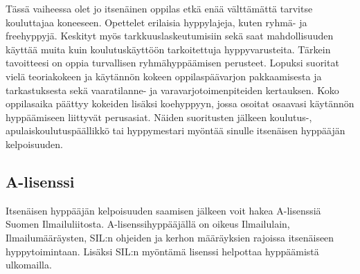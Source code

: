 Tässä vaiheessa olet jo itsenäinen oppilas etkä enää välttämättä tarvitse kouluttajaa koneeseen. Opettelet erilaisia hyppylajeja, kuten ryhmä- ja freehyppyjä. Keskityt myös tarkkuuslaskeutumisiin sekä saat mahdollisuuden käyttää muita kuin koulutuskäyttöön tarkoitettuja hyppyvarusteita. Tärkein tavoitteesi on oppia turvallisen ryhmähyppäämisen perusteet. Lopuksi suoritat vielä teoriakokeen ja käytännön kokeen oppilaspäävarjon pakkaamisesta ja tarkastuksesta sekä vaaratilanne- ja varavarjotoimenpiteiden kertauksen. Koko oppilasaika päättyy kokeiden lisäksi koehyppyyn, jossa osoitat osaavasi käytännön hyppäämiseen liittyvät perusasiat. Näiden suoritusten jälkeen koulutus\mbox{-,} apulaiskoulutuspäällikkö tai hyppymestari myöntää sinulle itsenäisen hyppääjän kelpoisuuden. 

\subsection{A-lisenssi}
\label{laskuvarjohyppykoulutus-a-lisenssi}


Itsenäisen hyppääjän kelpoisuuden saamisen jälkeen voit hakea A-lisenssiä Suomen Ilmailuliitosta. A-lisenssihyppääjällä on oikeus Ilmailulain, Ilmailumääräysten, SIL:n ohjeiden ja kerhon määräyksien rajoissa itsenäiseen hyppytoimintaan. Lisäksi SIL:n myöntämä lisenssi helpottaa hyppäämistä ulkomailla. 

